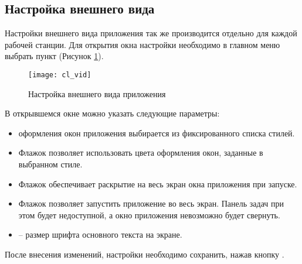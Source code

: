 \subsection{Настройка внешнего вида}

Настройки внешнего вида приложения так же производится отдельно для каждой рабочей станции. Для открытия окна настройки необходимо в главном меню выбрать пункт  (Рисунок \ref{img_cl_vid}).

\begin{figure}[ht!]\centering
 \texttt{[image: cl\_vid]}
 \caption{Настройка внешнего вида приложения}
 \label{img_cl_vid}
\end{figure}

В открывшемся окне можно указать следующие параметры:
\begin{itemize}
 \item {} оформления окон приложения выбирается из фиксированного списка стилей.
 \item Флажок  позволяет использовать цвета оформления окон, заданные в выбранном стиле.
 \item Флажок  обеспечивает раскрытие на весь экран окна приложения при запуске.
 \item Флажок  позволяет запустить приложение во весь экран. Панель задач при этом будет недоступной, а окно приложения невозможно будет свернуть.
 \item {} – размер шрифта основного текста на экране.
\end{itemize}
 
После внесения изменений, настройки необходимо сохранить, нажав кнопку .
